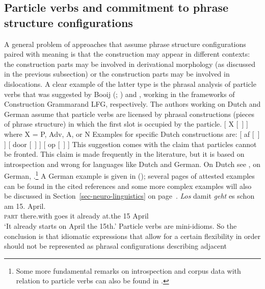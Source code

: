 \begin{exe}
\begin{xlist}[iv.]
\begin{exe}
\begin{xlist}[iv.]
\subsection{Particle verbs and commitment to phrase structure configurations}
\label{sec-particle-verbs-phrasal}

A general problem of approaches that assume phrase structure configurations paired with meaning is
that the construction may appear in different contexts: the construction parts may be involved in
derivational morphology (as discussed in the previous subsection) or the construction parts may be
involved in dislocations. A clear example of the latter type is the phrasal analysis of particle
verbs that was suggested by Booij (\citeyear[Section~2]{Booij2002a}; \citeyear{Booij2012a-u}) and  \citet{Blom2005a}, working in the
frameworks of Construction Grammar\indexcxg and LFG\indexlfg, respectively. The authors working on Dutch and German assume that particle verbs are licensed by
phrasal constructions (pieces of phrase structure) in which the first slot is occupied by the particle. 
\ea
{}[ X [~] ] where X = P, Adv, A, or N
\z
Examples for specific Dutch constructions are:
\eal
\label{particle-konstruktionen}
\ex {}[ af   [~] ]
\ex {}[ door [~] ]
\ex {}[ op   [~] ]
\zl 
This suggestion comes with the claim that particles cannot be fronted.  This claim is made
frequently in the literature, but it is based on introspection and wrong for languages like Dutch and German. On Dutch see , on German,
.\footnote{%
Some more fundamental remarks on
introspection and corpus data with relation to particle verbs can also be found in
.
} 
A German example is given in (); several pages of attested examples can be found in the cited references and some more complex examples will
also be discussed in Section~\ref{sec-neuro-linguistics} on page~\pageref{ex-complex-vf}.
\ea\label{bsp-los-damit-zwei}
\gll \emph{Los} damit \emph{geht} es schon am 15. April.\footnotemark\\
     \textsc{part} there.with goes it already at.the 15 April\\%
%
\glt `It already starts on April the 15th.'
\z
Particle verbs are mini-idioms. So the conclusion is that idiomatic expressions that 
allow for a certain flexibility in order should not be represented as phrasal configurations describing adjacent

\end{xlist}
\end{exe}
\end{xlist}
\end{exe}
